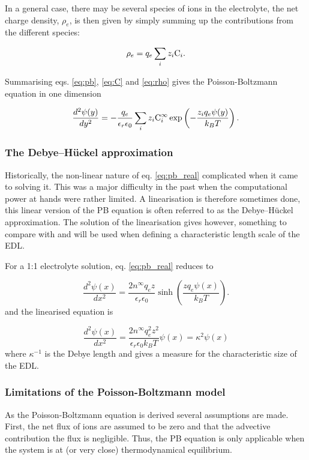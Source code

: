 In a general case, there may be several species of ions in the
electrolyte, the net charge density, $\rho_e$, is then given by simply
summing up the contributions from the different species:

\begin{equation}\label{eq:rho}
\rho_e = q_e\sum_i z_i \mathrm{C}_i.
\end{equation}

Summarising eqs. \eqref{eq:pb}, \eqref{eq:C} and \eqref{eq:rho} gives
the Poisson-Boltzmann equation in one dimension

\begin{equation}\label{eq:pb_real}
\dfrac{d^2\mathrm{\psi}(y)}{dy^2} = -\frac{q_e}{\epsilon_r \epsilon_0}\sum_i z_i
\mathrm{C}_i^{\infty} \exp\left(-\frac{z_i q_e \mathrm{\psi}(y)}{k_BT}\right).
\end{equation}

\subsubsection{The Debye–Hückel approximation}
Historically, the non-linear nature of eq. \eqref{eq:pb_real}
complicated when it came to solving it. This was a major difficulty in
the past when the computational power at hands were rather limited. A
linearisation is therefore sometimes done, this linear version of the
PB equation is often referred to as the Debye–Hückel
approximation. The solution of the linearisation gives however,
something to compare with and will be used when defining a
characteristic length scale of the EDL.

For a 1:1 electrolyte solution, eq. \eqref{eq:pb_real} reduces to

\begin{equation}
\frac{d^2\psi(x)}{dx^2} = \frac{2n^{\infty}q_ez}{\epsilon_r
  \epsilon_0}
\sinh\left(\frac{z q_e \psi(x)}{k_BT}\right).
\end{equation}
and the linearised equation is

\begin{equation}
\frac{d^2\psi(x)}{dx^2} = \frac{2n^{\infty}q_e^2z^2}{\epsilon_r
  \epsilon_0 k_B T} \psi(x) = \kappa^2 \psi(x)
\end{equation}
where $\kappa^{-1}$ is the Debye length and gives a measure for the
characteristic size of the EDL.

\subsubsection{Limitations of the Poisson-Boltzmann model}
As the Poisson-Boltzmann equation is derived several assumptions are
made. First, the net flux of ions are assumed to be zero and that the
advective contribution the flux is negligible. Thus, the PB equation is
only applicable when the system is at (or very close) thermodynamical
equilibrium.

